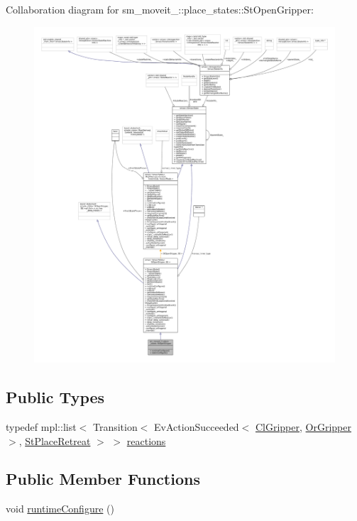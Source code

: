 Collaboration diagram for sm\+\_\+moveit\+\_\+:\+:place\+\_\+states\+:\+:St\+Open\+Gripper\+:
\nopagebreak
\begin{figure}[H]
\begin{center}
\leavevmode
\includegraphics[width=350pt]{structsm__moveit__2_1_1place__states_1_1StOpenGripper__coll__graph}
\end{center}
\end{figure}
\subsection*{Public Types}
\begin{DoxyCompactItemize}
\item 
typedef mpl\+::list$<$ Transition$<$ Ev\+Action\+Succeeded$<$ \hyperlink{classsm__moveit__2_1_1cl__gripper_1_1ClGripper}{Cl\+Gripper}, \hyperlink{classsm__moveit__2_1_1OrGripper}{Or\+Gripper} $>$, \hyperlink{structsm__moveit__2_1_1place__states_1_1StPlaceRetreat}{St\+Place\+Retreat} $>$ $>$ \hyperlink{structsm__moveit__2_1_1place__states_1_1StOpenGripper_afd1f2246cc13deea3cc17e2c8dd15eef}{reactions}
\end{DoxyCompactItemize}
\subsection*{Public Member Functions}
\begin{DoxyCompactItemize}
\item 
void \hyperlink{structsm__moveit__2_1_1place__states_1_1StOpenGripper_a80b566ae6d13f1b0998c56dbef867579}{runtime\+Configure} ()
\end{DoxyCompactItemize}
